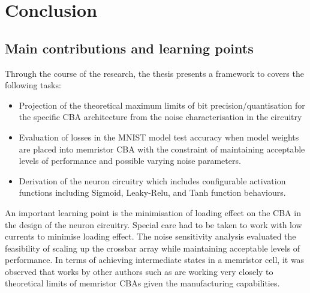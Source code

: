 
\chapter{Conclusion}
\label{ch:conclusion}

\vspace{2em}

\section{Main contributions and learning points}


\noindent
Through the course of the research, the thesis presents a framework to covers the following tasks:

\begin{itemize}

    \item Projection of the theoretical maximum limits of bit precision/quantisation for the specific \ac{CBA} architecture from the noise characterisation in the circuitry

    \item Evaluation of losses in the MNIST model test accuracy when model weights are placed into memristor \ac{CBA} \textemdash{} with the constraint of maintaining acceptable levels of performance and possible varying noise parameters.

    \item Derivation of the neuron circuitry which includes configurable activation functions \textemdash{} including Sigmoid, Leaky-Relu, and Tanh function behaviours.

\end{itemize}

An important learning point is the minimisation of loading effect on the \ac{CBA} in the design of the neuron circuitry. Special care had to be taken to work with low currents to minimise loading effect. The noise sensitivity analysis evaluated the feasibility of scaling up the crossbar array while maintaining acceptable levels of performance. In terms of achieving intermediate states in a memristor cell, it was observed that works by other authors such as \citet{PengGu2015} \cite{PengGu2015} are working very closely to theoretical limits of memristor \acp{CBA} given the manufacturing capabilities.

